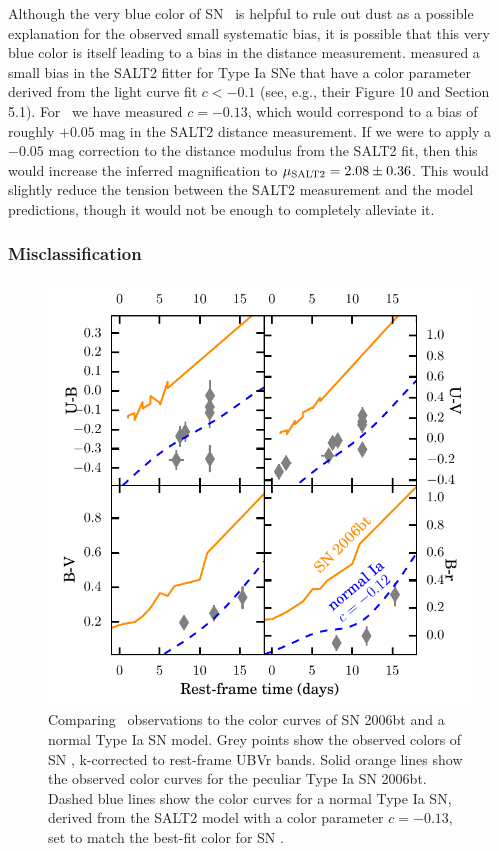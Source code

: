 Although the very blue color of SN \tomas\ is helpful to rule out dust
as a possible explanation for the observed small systematic bias, it
is possible that this very blue color is itself leading to a bias in
the distance measurement.  \citet{Scolnic:2014b} measured a small bias
in the SALT2 fitter for Type Ia SNe that have a color parameter
derived from the light curve fit $c<-0.1$ (see, e.g., their Figure 10
and Section 5.1). For \tomas\ we have measured $c=-0.13$, which would
correspond to a bias of roughly $+0.05$ mag in the SALT2 distance
measurement.  If we were to apply a $-0.05$ mag correction to the
distance modulus from the SALT2 fit, then this would increase the
inferred magnification to $\mu_{\rm SALT2}=2.08\pm0.36$.  This would
slightly reduce the tension between the SALT2 measurement and the model predictions, though it would not be enough to completely alleviate it.

\subsubsection{Misclassification}
\label{sec:Misclassification}

\begin{figure}
\begin{center}
\includegraphics[width=\columnwidth]{snTomas_sn06bt_colorcurves}
\caption{ 
Comparing \tomas\ observations to the color curves of SN 2006bt and a
normal Type Ia SN model. Grey points show the observed colors of
SN \tomas, k-corrected to rest-frame UBVr bands. Solid orange lines
show the observed color curves for the peculiar Type Ia SN
2006bt. Dashed blue lines show the color curves for a normal Type Ia
SN, derived from the SALT2 model with a color parameter $c=-0.13$, set
to match the best-fit color for SN \tomas.
\label{fig:colorcomparison} }
\end{center}
\end{figure}

